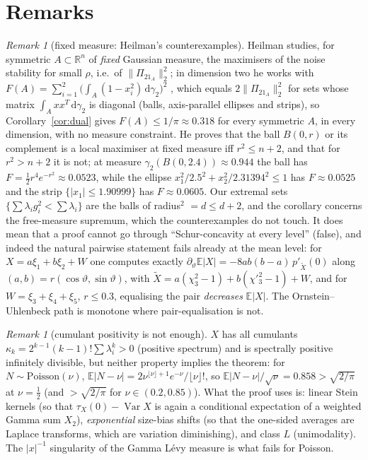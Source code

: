 \documentclass[11pt]{article}
\theoremstyle{remark}
\newtheorem{remark}[theorem]{Remark}
\newcommand{\E}{\mathbb{E}}
\newcommand{\R}{\mathbb{R}}
\newcommand{\Var}{\operatorname{Var}}
\newcommand{\dd}{\,\mathrm{d}}
\begin{document}
\section{Remarks}\label{sec:remarks}

\begin{remark}[fixed measure: Heilman's counterexamples]
Heilman \cite{Heilman} studies, for symmetric $A\subset\R^n$ of \emph{fixed} Gaussian measure, the maximisers of the noise stability for small
$\rho$, i.e.\ of $\|\Pi_21_A\|_2^2$; in dimension two he works with $F(A)=\sum_{i=1}^2\big(\int_A(1-x_i^2)\dd\gamma_2\big)^2$ \cite[eq.~(4)]{Heilman},
which equals $2\|\Pi_21_A\|_2^2$ for sets whose matrix $\int_Axx^T\dd\gamma_2$ is diagonal (balls, axis-parallel ellipses and strips), so
Corollary~\ref{cor:dual} gives $F(A)\le1/\pi\approx0.318$ for every symmetric $A$, in every dimension, with no measure constraint.
He proves that the ball $B(0,r)$ or its complement is a local maximiser at fixed measure iff $r^2\le n+2$, and that for $r^2>n+2$ it is not;
at measure $\gamma_2(B(0,2.4))\approx0.944$ the ball has $F=\tfrac12r^4e^{-r^2}\approx0.0523$, while the ellipse $x_1^2/2.5^2+x_2^2/2.31394^2\le1$
has $F\approx0.0525$ and the strip $\{|x_1|\le1.90999\}$ has $F\approx0.0605$.
Our extremal sets $\{\sum\lambda_ig_i^2<\sum\lambda_i\}$ are the balls of radius$^2$ $=d\le d+2$, and the corollary concerns the free-measure
supremum, which the counterexamples do not touch. It does mean that a proof cannot go through ``Schur-concavity at every level'' (false), and
indeed the natural pairwise statement fails already at the mean level: for $X=a\xi_1+b\xi_2+W$ one computes exactly
$\partial_\vartheta\E|X|=-8ab(b-a)\,p'_{\tilde X}(0)$ along $(a,b)=r(\cos\vartheta,\sin\vartheta)$, with $\tilde X=a(\chi^2_3-1)+b(\chi'^2_3-1)+W$,
and for $W=\xi_3+\xi_4+\xi_5$, $r\le0.3$, equalising the pair \emph{decreases} $\E|X|$. The Ornstein--Uhlenbeck path is monotone where
pair-equalisation is not.
\end{remark}

\begin{remark}[cumulant positivity is not enough]
$X$ has all cumulants $\kappa_k=2^{k-1}(k-1)!\sum\lambda_i^k>0$ (positive spectrum) and is spectrally positive infinitely divisible, but neither
property implies the theorem: for $N\sim\mathrm{Poisson}(\nu)$, $\E|N-\nu|=2\nu^{\lfloor\nu\rfloor+1}e^{-\nu}/\lfloor\nu\rfloor!$, so
$\E|N-\nu|/\sqrt\nu=0.858>\sqrt{2/\pi}$ at $\nu=\tfrac12$ (and $>\sqrt{2/\pi}$ for $\nu\in(0.2,0.85)$). What the proof uses is: linear Stein kernels
(so that $\tau_X(0)-\Var X$ is again a conditional expectation of a weighted Gamma sum $X_2$), \emph{exponential} size-bias shifts (so that the
one-sided averages are Laplace transforms, which are variation diminishing), and class $L$ (unimodality). The $|x|^{-1}$ singularity of the
Gamma L\'evy measure is what fails for Poisson.
\end{remark}
\end{document}
